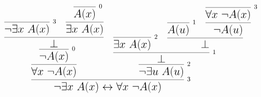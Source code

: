 \documentclass[14pt,border=2pt]{standalone}
\begin{document}
        $$
        \LARGE 

\begin{prooftree}
\infer0[\normalsize 3]{\neg \exists x~ A(x)}
\infer0[\normalsize 0]{A(x)}
\infer1{\exists x~ A(x)}
\infer2{\bot} 
\infer1[\normalsize 0]{\neg A(x)}
\infer1{\forall x~ \neg A(x)} 
\infer0[\normalsize 2]{\exists x~ A(x)}
\infer0[\normalsize 1]{A(u)}
\infer0[\normalsize 3]{\forall x~ \neg A(x)}
\infer1{\neg A(u)}
\infer2{\bot}
\infer2[\normalsize 1]{\bot}
\infer1[\normalsize 2]{\neg \exists u~ A(u)} 
\infer2[\normalsize 3]{\neg \exists x~ A(x) \leftrightarrow \forall x~ \neg A(x)}
\end{prooftree}
        $$
        
\end{document}
